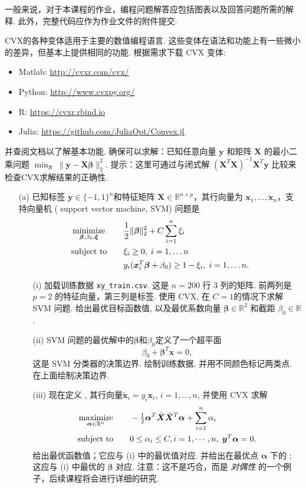 \documentclass[a4paper,12pt]{ctexart}
\def\Min{{\rm minimize}}
\def\Max{{\rm maximize}}
\def\ST{{\rm subject\ to}}
\def\R{{\mathbb R}}%
\newcommand\ga{\bm \alpha}
\newcommand\gb{\bm \beta}
\newcommand\bx{{\bm x}}
\newcommand\by{{\bm y}}
\newcommand\bX{{\bm X}}
\begin{document}
\begin{enumerate}
一般来说，对于本课程的作业，编程问题解答应包括图表以及回答问题所需的解释. 此外，完整代码应作为作业文件的附件提交.

CVX的各种变体适用于主要的数值编程语言. 这些变体在语法和功能上有一些微小的差异，但基本上提供相同的功能. 根据需求下载 CVX 变体:
\begin{itemize}
\item Matlab: \url{http://cvxr.com/cvx/}
\item Python: \url{http://www.cvxpy.org/}
\item R: \url{https://cvxr.rbind.io}
\item Julia: \url{https://github.com/JuliaOpt/Convex.jl}
\end{itemize}
并查阅文档以了解基本功能. 确保可以求解：已知任意向量 $\by$ 和矩阵 $\bX$ 的最小二乘问题 $\min_{\gb} \; \|\by-\bX\gb\|_2^2$. 提示：这里可通过与闭式解 $(\bX^T \bX)^{-1} \bX^T \by$ 比较来检查CVX求解结果的正确性.

\begin{enumerate}
\item [(a)] 已知标签 $\by \in \{-1,1\}^n$和特征矩阵 $\bX \in \R^{n\times p}$，其行向量为 $\bx_1,\ldots, \bx_n$，支持向量机 ( support vector machine, SVM) 问题是
\begin{alignat*}{2}
&\mathop{\Min}\limits_{\gb,\beta_0,\bm\xi} \quad
&& \frac{1}{2} \|\gb\|_2^2 + C \sum_{i=1}^n \xi_i \\
&\ST \quad && \xi_i \geq 0, \; i=1,\ldots n \\
& && y_i(\bx_i^T \gb + \beta_0) \geq 1-\xi_i, \;
i=1,\ldots n.
\end{alignat*}
\begin{enumerate}
\item [(i)] 加载训练数据 {\tt xy\_train.csv}. 这是 $n=200$ 行 3 列的矩阵. 前两列是 $p=2$ 的特征向量，第三列是标签. 使用 CVX, 在 $C=1$的情况下求解 SVM 问题. 给出最优目标函数值, 以及最优系数向量 $\gb \in \R^2$ 和截距 $\beta_0 \in \R$.

\item [(ii)]  SVM 问题的最优解中的$\gb$和$\beta_0$定义了一个超平面
  \begin{equation}\label{eq:svmhyperplane}
  \beta_0 + \gb^T \bx = 0,
  \end{equation}
  这是 SVM 分类器的决策边界. 绘制训练数据, 并用不同颜色标记两类点. 在上面绘制决策边界.

\item[(iii)]  现在定义 \smash{$\tilde{\bX} \in \R^{n \times p}$} , 其行向量$\tilde{\bx}_i=y_i \bx_i$, $i=1,\ldots,n$, 并使用 CVX 求解
  \begin{alignat*}{2}
    &\mathop{\Max}_{\ga\in\R^n} && -\tfrac{1}{2} \ga^T \tilde{\bX} \tilde{\bX}^T \ga + \sum_{i=1}^n\alpha_i \\
    &\ST \quad && 0 \leq \alpha_i \leq C, i=1,\cdots,n,\; \by^T \ga = 0.
  \end{alignat*}
给出最优函数值；它应与 (i) 中的最优值对应. 并给出在最优点 $\ga$ 下的 \smash{$\tilde{\bX}^T \ga$}; 这应与 (i) 中最优的 $\gb$ 对应. 注意：这不是巧合，而是 {\it 对偶性} 的一个例子，后续课程将会进行详细的研究.


\end{enumerate}
\end{enumerate}
\end{enumerate}
\end{document}
